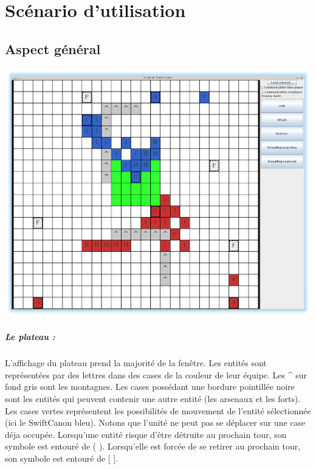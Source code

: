 \chapter{Scénario d'utilisation}

	\section{Aspect général}

		\includegraphics[scale=0.4]{images/screen1.eps}
		
		\paragraph{Le plateau :}
			L'affichage du plateau prend la majorité de la fenêtre.
			Les entités sont représentées par des lettres dans des cases de la couleur de leur équipe.
			Les \^{} sur fond gris sont les montagnes.
			Les cases possédant une bordure pointillée noire sont les entités qui peuvent contenir une autre entité	(les arsenaux et les forts).
			Les cases vertes représentent les possibilités de mouvement	de l'entité sélectionnée (ici le SwiftCanon bleu). 
			Notons que l'unité ne peut pas se déplacer sur une case déja occupée.
			Lorsqu'une entité risque d'être détruite au prochain tour, son symbole est entouré de ( ).
			Lorsqu'elle est forcée de se retirer au prochain tour, son symbole est entouré de [ ].
	

